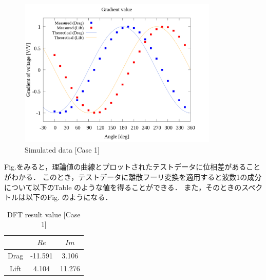 \begin{figure}[htbp]
    \footnotesize
    \begin{center}
        \includegraphics[width=95mm]{../../02_workspace/result/rotation_tx=15.0_tx=20.0/plot/20/20_adjust-value.png}
        \caption{Simulated data [Case 1]}
    \end{center}
\end{figure}

Fig.をみると，理論値の曲線とプロットされたテストデータに位相差があることがわかる．
このとき，テストデータに離散フーリ変換を適用すると波数1の成分について以下のTable のような値を得ることができる．
また，そのときのスペクトルは以下のFig. のようになる．

\begin{table}[htbp]
    \begin{center}
        \caption{DFT result value [Case 1]}
        \begin{tabular}{|p{30mm}|p{20mm}|p{20mm}|}
            \hline
            \multicolumn{1}{|c|}{}       & \multicolumn{1}{|c|}{$Re$}   & \multicolumn{1}{|c|}{$Im$} \\ \hline
            \multicolumn{1}{|c|}{Drag} & \multicolumn{1}{|c|}{-11.591} & \multicolumn{1}{|c|}{3.106}         \\ \hline
            \multicolumn{1}{|c|}{Lift} & \multicolumn{1}{|c|}{4.104}     & \multicolumn{1}{|c|}{11.276}         \\ \hline
        \end{tabular}
    \end{center}
\end{table}

